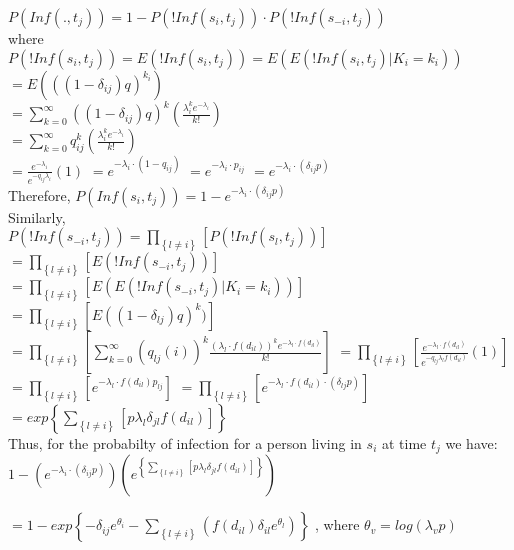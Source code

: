 \documentclass[12pt]{article}
\newcommand \mbreak {\\ \vspace{0.1in}}
\begin{document}
\begin{center}

    $P(Inf(.,t_j)) = 1 - P(!Inf(s_i, t_j)) \cdot  P(!Inf(s_{-i}, t_j))$ \mbreak
    where \mbreak 
    $P(!Inf(s_i, t_j)) = E(!Inf(s_i, t_j)) = E(E(!Inf(s_i, t_j)|K_i=k_i))$  \mbreak 
    $\displaystyle =E(((1-\delta_{ij})q)^{k_i})$  \mbreak 
    $\displaystyle = \sum_{k=0}^{\infty} ((1-\delta_{ij})q)^k(\frac{\lambda_i^ke^{-\lambda_i}}{k!})$\mbreak
    $\displaystyle =  \sum_{k=0}^{\infty} q_{ij}^k (\frac{\lambda_i^ke^{-\lambda_i}}{k!})$\mbreak
    $\displaystyle = \frac{e^{-\lambda_i}}{e^{-q_{ij}\lambda_i}}(1)$
    $ = e^{-\lambda_i\cdot(1-q_{ij})} $
    $ = e^{-\lambda_i \cdot p_{ij}} $
    $ = e^{-\lambda_i \cdot (\delta_{ij}p)}$ \mbreak
    Therefore,  $P(Inf(s_i, t_j)) = 1 - e^{-\lambda_i \cdot (\delta_{ij}p)} $ \mbreak
    Similarly,\mbreak
    $\displaystyle P(!Inf(s_{-i}, t_j)) = \prod_{\left\{l \ne i\right\}}\left[P(!Inf(s_l, t_j)) \right]$ \mbreak
    $\displaystyle = \prod_{\left\{ l \ne i \right\}}\left[E(!Inf(s_{-i}, t_j))\right] $
    $\displaystyle = \prod_{\left\{ l \ne i \right\}}\left[E(E(!Inf(s_{-i}, t_j)|K_i=k_i)) \right]$  \mbreak 
    $\displaystyle = \prod_{\left\{ l \ne i \right\}}\left[ E((1-\delta_{lj})q)^k )  \right]$\mbreak 
    $\displaystyle = \prod_{\left\{ l \ne i \right\}}\left[ \sum_{k=0}^{\infty}(q_{lj}(i))^k\frac{(\lambda_l\cdot f(d_{il}))^ke^{-\lambda_l \cdot f(d_{il})}}{k!}    \right] $
    $\displaystyle = \prod_{\left\{ l \ne i \right\}}\left[ \frac{e^{-\lambda_l \cdot f(d_{il})}}{e^{-q_{lj}\lambda_l f(d_{il})}}(1)  \right]$\mbreak
    $\displaystyle = \prod_{\left\{ l \ne i \right\}}\left[ e^{-\lambda_l \cdot f(d_{il}) p_{lj}}  \right]$
    $\displaystyle = \prod_{\left\{ l \ne i \right\}}\left[ e^{-\lambda_l\cdot f(d_{il}) \cdot (\delta_{lj}p) }  \right]$\mbreak
    $\displaystyle = exp\left\{\sum_{\left\{ l \ne i \right\}}\left[p\lambda_l\delta_{jl}f(d_{il})   \right] \right\}$ \mbreak
    Thus, for the probabilty of infection for a person living in $s_i$ at time $t_j$ we have: \mbreak 
    $\displaystyle 1-\left(e^{-\lambda_i \cdot (\delta_{ij}p)}\right) \left( 
        e^{\left\{\sum_{\left\{ l \ne i \right\}}\left[p\lambda_l\delta_{jl}f(d_{il})   \right] \right\}}\right)
     $ \mbreak 

    $\displaystyle = 1- exp\left\{-\delta_{ij}e^{\theta_{i}} - \sum_{\left\{ l \ne i  \right\}}
        (f(d_{il})\delta_{il}e^{\theta_{l}})   \right\}$ 
    , where $\theta_{v} = log(\lambda_{v}p)$
 
\end{center}
\end{document}
